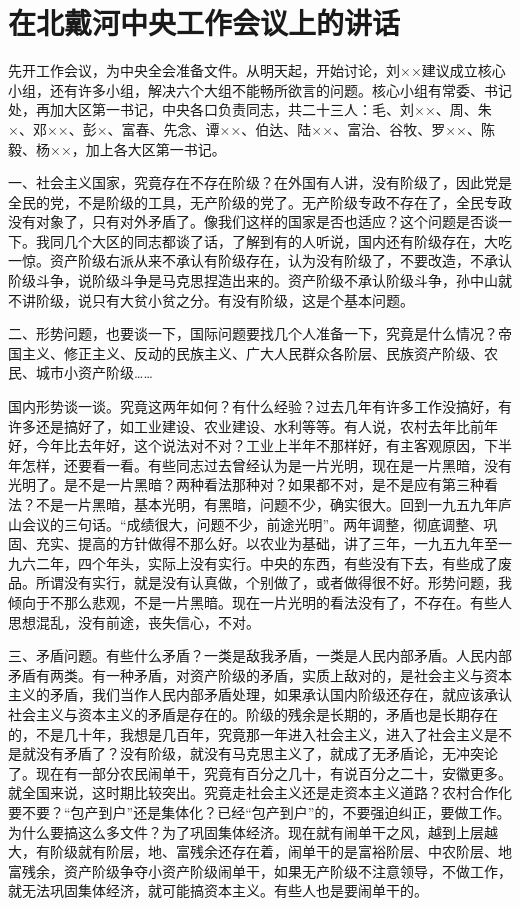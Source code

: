 \section[在北戴河中央工作会议上的讲话（一九六二年八月六日）]{在北戴河中央工作会议上的讲话}


先开工作会议，为中央全会准备文件。从明天起，开始讨论，刘××建议成立核心小组，还有许多小组，解决六个大组不能畅所欲言的问题。核心小组有常委、书记处，再加大区第一书记，中央各口负责同志，共二十三人：毛、刘××、周、朱×、邓××、彭×、富春、先念、谭××、伯达、陆××、富治、谷牧、罗××、陈毅、杨××，加上各大区第一书记。

一、社会主义国家，究竟存在不存在阶级？在外国有人讲，没有阶级了，因此党是全民的党，不是阶级的工具，无产阶级的党了。无产阶级专政不存在了，全民专政没有对象了，只有对外矛盾了。像我们这样的国家是否也适应？这个问题是否谈一下。我同几个大区的同志都谈了话，了解到有的人听说，国内还有阶级存在，大吃一惊。资产阶级右派从来不承认有阶级存在，认为没有阶级了，不要改造，不承认阶级斗争，说阶级斗争是马克思捏造出来的。资产阶级不承认阶级斗争，孙中山就不讲阶级，说只有大贫小贫之分。有没有阶级，这是个基本问题。

二、形势问题，也要谈一下，国际问题要找几个人准备一下，究竟是什么情况？帝国主义、修正主义、反动的民族主义、广大人民群众各阶层、民族资产阶级、农民、城市小资产阶级……

国内形势谈一谈。究竟这两年如何？有什么经验？过去几年有许多工作没搞好，有许多还是搞好了，如工业建设、农业建设、水利等等。有人说，农村去年比前年好，今年比去年好，这个说法对不对？工业上半年不那样好，有主客观原因，下半年怎样，还要看一看。有些同志过去曾经认为是一片光明，现在是一片黑暗，没有光明了。是不是一片黑暗？两种看法那种对？如果都不对，是不是应有第三种看法？不是一片黑暗，基本光明，有黑暗，问题不少，确实很大。回到一九五九年庐山会议的三句话。“成绩很大，问题不少，前途光明”。两年调整，彻底调整、巩固、充实、提高的方针做得不那么好。以农业为基础，讲了三年，一九五九年至一九六二年，四个年头，实际上没有实行。中央的东西，有些没有下去，有些成了废品。所谓没有实行，就是没有认真做，个别做了，或者做得很不好。形势问题，我倾向于不那么悲观，不是一片黑暗。现在一片光明的看法没有了，不存在。有些人思想混乱，没有前途，丧失信心，不对。

三、矛盾问题。有些什么矛盾？一类是敌我矛盾，一类是人民内部矛盾。人民内部矛盾有两类。有一种矛盾，对资产阶级的矛盾，实质上敌对的，是社会主义与资本主义的矛盾，我们当作人民内部矛盾处理，如果承认国内阶级还存在，就应该承认社会主义与资本主义的矛盾是存在的。阶级的残余是长期的，矛盾也是长期存在的，不是几十年，我想是几百年，究竟那一年进入社会主义，进入了社会主义是不是就没有矛盾了？没有阶级，就没有马克思主义了，就成了无矛盾论，无冲突论了。现在有一部分农民闹单干，究竟有百分之几十，有说百分之二十，安徽更多。就全国来说，这时期比较突出。究竟走社会主义还是走资本主义道路？农村合作化要不要？“包产到户”还是集体化？已经“包产到户”的，不要强迫纠正，要做工作。为什么要搞这么多文件？为了巩固集体经济。现在就有闹单干之风，越到上层越大，有阶级就有阶层，地、富残余还存在着，闹单干的是富裕阶层、中农阶层、地富残余，资产阶级争夺小资产阶级闹单干，如果无产阶级不注意领导，不做工作，就无法巩固集体经济，就可能搞资本主义。有些人也是要闹单干的。

